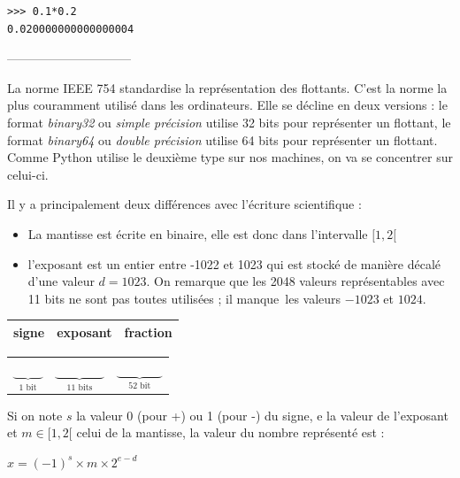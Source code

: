 \begin{lstlisting}
>>> 0.1*0.2
0.020000000000000004
\end{lstlisting}
\begin{center}
------------------------------
\end{center}

La norme IEEE 754 standardise la représentation des flottants. C'est la norme la plus couramment utilisé dans les ordinateurs. Elle se décline en deux versions : le format \emph{binary32} ou \emph{simple précision} utilise 32 bits pour représenter un flottant, 
le format \emph{binary64} ou \emph{double précision} utilise 64 bits pour représenter un flottant. Comme Python utilise le deuxième type sur nos machines, on va se concentrer sur celui-ci.
\medskip

Il y a principalement deux différences avec l'écriture scientifique : 
\smallskip

\begin{itemize}
  \item La mantisse est écrite en binaire, elle est donc dans l'intervalle $[1, 2[$
  \item l'exposant est un entier entre -1022 et 1023 qui est stocké de manière décalé d'une valeur $d = 1023$. On remarque que les 2048 valeurs représentables avec 11 bits ne sont pas toutes utilisées ; il \og manque\fg\ les valeurs $-1023$ et $1024$. 
\end{itemize}

\begin{center}
	\begin{tabular}{| c | c | c | }
		\hline
		signe & exposant & fraction \\ \hline
		\end{tabular}
	
	\vspace{-0.3cm}
		\begin{tabular}{ c  c  c  }
	
		$\underbrace{\phantom{signe}}_{\text{1 bit}}$ & $\underbrace{\phantom{exposant}}_{\text{11 bits}}$ & $\underbrace{\phantom{fraction}}_{\text{52 bit}}$ \\ 
	\end{tabular}
	
\end{center}


Si on note $s$ la valeur 0 (pour +) ou 1 (pour -) du signe, e la valeur de l'exposant et $m\in [1, 2[$ celui de la mantisse, la valeur du nombre représenté est :

\begin{center}
	$x = (-1)^s\times m\times 2^{e-d}$ 
\end{center}


